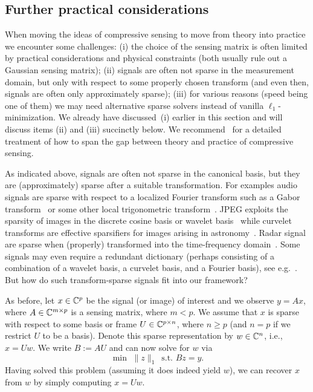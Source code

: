 \subsection{Further practical considerations} \label{s:cs_practice}

When moving the ideas of compressive sensing to move from theory into practice we encounter some challenges: (i) the choice of the sensing matrix is often limited by practical considerations and physical constraints (both usually rule out a Gaussian sensing matrix); (ii) signals are often not sparse in the measurement domain, but only with respect to some properly chosen transform (and even then, signals are often only approximately sparse);  (iii) for various reasons (speed being one of them) we may need alternative sparse solvers instead of vanilla $\ell_1$-minimization. We already have  discussed~(i) earlier in this section and will 
discuss items (ii) and (iii) succinctly below.  We recommend~\cite{Adcock-Hansen-book} for a detailed treatment of how to span the gap between theory and practice of compressive sensing.



As indicated above, signals are often not sparse in the canonical basis, but they are (approximately) sparse after a suitable transformation. For examples audio signals are sparse with respect to a localized Fourier transform such as a Gabor transform~\cite{daudet2006sparse} or some other local trigonometric transform~\cite{malvar1992signal,mallat_book}. 
JPEG exploits the sparsity of images in the discrete cosine basis or wavelet basis~\cite{mallat_book} while curvelet transforms are effective sparsifiers for images arising in astronomy~\cite{starck2003astronomical}. Radar signal are sparse when (properly) transformed into the time-frequency domain~\cite{herman2009high}. 
Some signals may even require a redundant dictionary (perhaps consisting of a combination of a wavelet basis, a curvelet basis, and a Fourier basis), see 
e.g.~\cite[Chapter 12]{mallat_book}. 
But how do such transform-sparse signals fit into our framework? 



As before, let $x \in \mathbb{C}^p$ be the signal (or image) of interest and we observe $y=Ax$, where $A \in \mathbb{C}^{m \times p}$ is a sensing matrix, where $m < p$. 
We assume that $x$ is sparse with respect to some basis or frame $U \in \mathbb{C}^{p \times n}$, where $n \ge p$ (and $n=p$ if we restrict $U$ to be a basis).
Denote this sparse representation by $w \in \mathbb{C}^n$, i.e.,  $x= Uw$. We write $B:=AU$ and can now solve for $w$ via
\begin{equation} \label{transformsparse}
\min \,\, \|z\|_1 \,\,\, \text{s.t.} \,\,  Bz = y.
\end{equation}
Having solved this problem (assuming it does indeed yield $w$), we can recover $x$ from $w$ by simply computing $x=Uw$.

